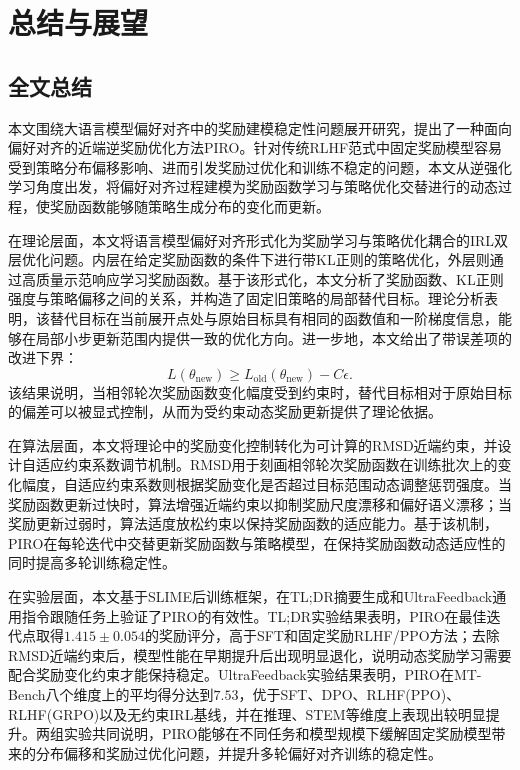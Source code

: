 
\chapter{总结与展望}

\section{全文总结}

本文围绕大语言模型偏好对齐中的奖励建模稳定性问题展开研究，提出了一种面向偏好对齐的近端逆奖励优化方法PIRO。针对传统RLHF范式中固定奖励模型容易受到策略分布偏移影响、进而引发奖励过优化和训练不稳定的问题，本文从逆强化学习角度出发，将偏好对齐过程建模为奖励函数学习与策略优化交替进行的动态过程，使奖励函数能够随策略生成分布的变化而更新。

在理论层面，本文将语言模型偏好对齐形式化为奖励学习与策略优化耦合的IRL双层优化问题。内层在给定奖励函数的条件下进行带KL正则的策略优化，外层则通过高质量示范响应学习奖励函数。基于该形式化，本文分析了奖励函数、KL正则强度与策略偏移之间的关系，并构造了固定旧策略的局部替代目标。理论分析表明，该替代目标在当前展开点处与原始目标具有相同的函数值和一阶梯度信息，能够在局部小步更新范围内提供一致的优化方向。进一步地，本文给出了带误差项的改进下界：
\begin{equation}
    L(\theta_{\mathrm{new}}) \ge L_{\mathrm{old}}(\theta_{\mathrm{new}})-C\epsilon .
\end{equation}
该结果说明，当相邻轮次奖励函数变化幅度受到约束时，替代目标相对于原始目标的偏差可以被显式控制，从而为受约束动态奖励更新提供了理论依据。

在算法层面，本文将理论中的奖励变化控制转化为可计算的RMSD近端约束，并设计自适应约束系数调节机制。RMSD用于刻画相邻轮次奖励函数在训练批次上的变化幅度，自适应约束系数则根据奖励变化是否超过目标范围动态调整惩罚强度。当奖励函数更新过快时，算法增强近端约束以抑制奖励尺度漂移和偏好语义漂移；当奖励更新过弱时，算法适度放松约束以保持奖励函数的适应能力。基于该机制，PIRO在每轮迭代中交替更新奖励函数与策略模型，在保持奖励函数动态适应性的同时提高多轮训练稳定性。

在实验层面，本文基于SLIME后训练框架，在TL;DR摘要生成和UltraFeedback通用指令跟随任务上验证了PIRO的有效性。TL;DR实验结果表明，PIRO在最佳迭代点取得$1.415 \pm 0.054$的奖励评分，高于SFT和固定奖励RLHF/PPO方法；去除RMSD近端约束后，模型性能在早期提升后出现明显退化，说明动态奖励学习需要配合奖励变化约束才能保持稳定。UltraFeedback实验结果表明，PIRO在MT-Bench八个维度上的平均得分达到$7.53$，优于SFT、DPO、RLHF(PPO)、RLHF(GRPO)以及无约束IRL基线，并在推理、STEM等维度上表现出较明显提升。两组实验共同说明，PIRO能够在不同任务和模型规模下缓解固定奖励模型带来的分布偏移和奖励过优化问题，并提升多轮偏好对齐训练的稳定性。


